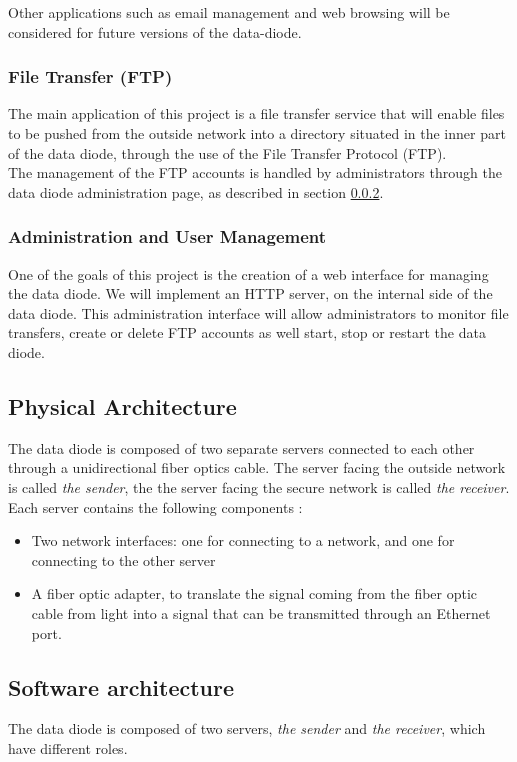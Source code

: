 \documentclass[a4paper,11pt]{article}
\begin{document}
Other applications such as email management and web browsing will be considered for future versions of the data-diode.

\subsubsection{File Transfer (FTP)}
The main application of this project is a file transfer service that will enable files to be pushed from the outside network into a directory situated in the inner part of the data diode, through the use of the File Transfer Protocol (FTP).\\

The management of the FTP accounts is handled by administrators through the data diode administration page, as described in section \ref{sec:administration}.

\subsubsection{Administration and User Management}
\label{sec:administration}
One of the goals of this project is the creation of a web interface for managing the data diode. We will implement an HTTP server, on the internal side of the data diode. This administration interface will allow administrators to monitor file transfers, create or delete FTP accounts as well start, stop or restart the data diode.

\subsection{Physical Architecture}
The data diode is composed of two separate servers connected to each other through a unidirectional fiber optics cable. The server facing the outside network is called \textit{the sender}, the the server facing the secure network is called \textit{the receiver}.\\

Each server contains the following components :
\begin{itemize}
\item{Two network interfaces: one for connecting to a network, and one for connecting to the other server}
\item{A fiber optic adapter, to translate the signal coming from the fiber optic cable from light into a signal that can be transmitted through an Ethernet port.}
\end{itemize}

\subsection{Software architecture}
The data diode is composed of two servers, \textit{the sender} and \textit{the receiver}, which have different roles. 
\end{document}
